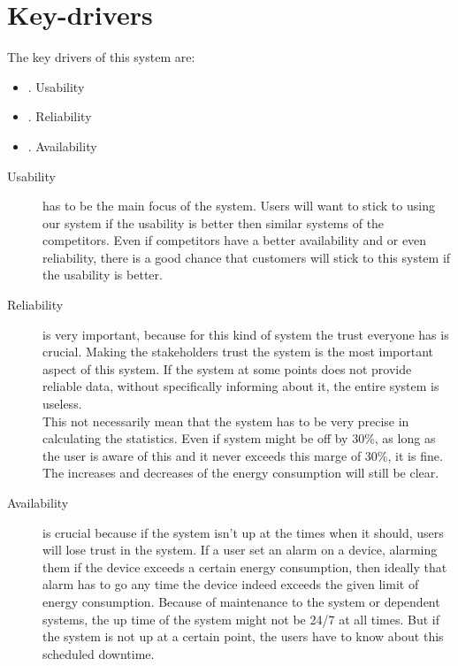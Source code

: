 \section{Key-drivers}
The key drivers of this system are:
\begin{itemize}
	\item {}. Usability
	\item {}. Reliability
	\item {}. Availability
\end{itemize}


\begin{description}

\item [Usability] has to be the main focus of the system. Users will want to stick to using our system if the usability is better then similar systems of the competitors. Even if competitors have a better availability and or even reliability, there is a good chance that customers will stick to this system if the usability is better. 

\item [Reliability] is very important, because for this kind of system the trust everyone has is crucial. Making the stakeholders trust the system is the most important aspect of this system. If the system at some points does not provide reliable data, without specifically informing about it, the entire system is useless.\\
This not necessarily mean that the system has to be very precise in calculating the statistics. Even if system might be off by 30\%, as long as the user is aware of this and it never exceeds this marge of 30\%, it is fine. The increases and decreases of the energy consumption will still be clear.

\item [Availability] is crucial because if the system isn't up at the times when it should, users will lose trust in the system. If a user set an alarm on a device, alarming them if the device exceeds a certain energy consumption, then ideally that alarm has to go any time the device indeed exceeds the given limit of energy consumption. Because of maintenance to the system or dependent systems, the up time of the system might not be 24/7 at all times. But if the system is not up at a certain point, the users have to know about this scheduled downtime.

\end{description}